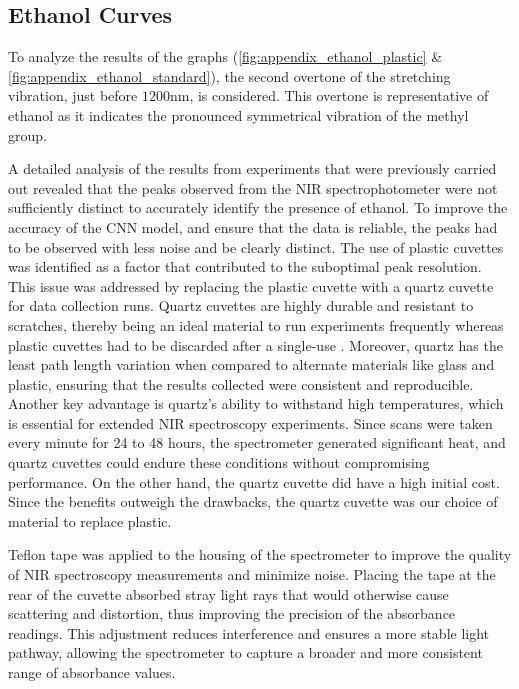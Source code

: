 \documentclass[final, 3p, 11pt]{elsarticle}
\begin{document}
\subsection{Ethanol Curves}
To analyze the results of the graphs (\autoref{fig:appendix_ethanol_plastic} \& \autoref{fig:appendix_ethanol_standard}), the second overtone of the  stretching vibration, just before $1200\text{nm}$, is considered. This overtone is representative of ethanol as it indicates the pronounced symmetrical vibration of the methyl group.

A detailed analysis of the results from experiments that were previously carried out revealed that the peaks observed from the NIR spectrophotometer were not sufficiently distinct to accurately identify the presence of ethanol. To improve the accuracy of the CNN model, and ensure that the data is reliable, the peaks had to be observed with less noise and be clearly distinct. The use of plastic cuvettes was identified as a factor that contributed to the suboptimal peak resolution. This issue was addressed by replacing the plastic cuvette with a quartz cuvette for data collection runs. 
Quartz cuvettes are highly durable and resistant to scratches, thereby being an ideal material to run experiments frequently whereas plastic cuvettes had to be discarded after a single-use \citep{CuvettesSpectrophotometerComprehensive2023}. Moreover, quartz has the least path length variation when compared to alternate materials like glass and plastic, ensuring that the results collected were consistent and reproducible. Another key advantage is quartz’s ability to withstand high temperatures, which is essential for extended NIR spectroscopy experiments. Since scans were taken every minute for 24 to 48 hours, the spectrometer generated significant heat, and quartz cuvettes could endure these conditions without compromising performance. On the other hand, the quartz cuvette did have a high initial cost. Since the benefits outweigh the drawbacks, the quartz cuvette was our choice of material to replace plastic.

Teflon tape was applied to the housing of the spectrometer to improve the quality of NIR spectroscopy measurements and minimize noise. Placing the tape at the rear of the cuvette absorbed stray light rays that would otherwise cause scattering and distortion, thus improving the precision of the absorbance readings. This adjustment reduces interference and ensures a more stable light pathway, allowing the spectrometer to capture a broader and more consistent range of absorbance values. 
\end{document}
